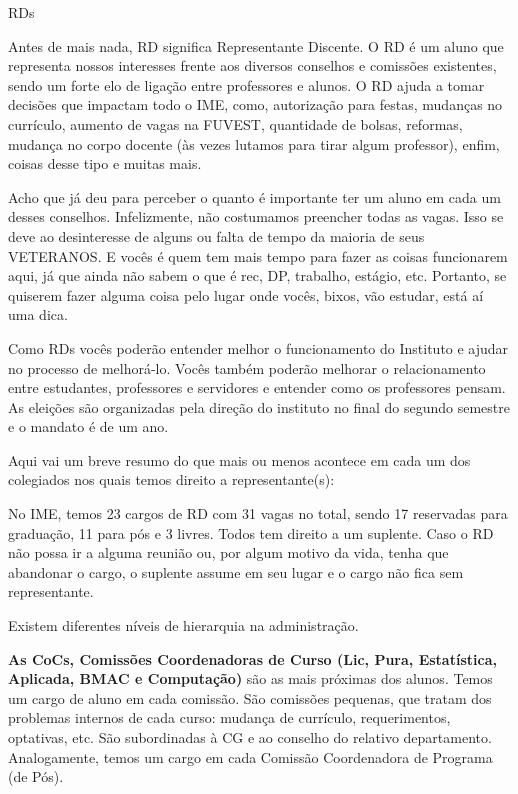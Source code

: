 \begin{subsecao}{RDs}

Antes de mais nada, RD significa Representante Discente. O RD é um aluno que
representa nossos interesses frente aos diversos conselhos e comissões
existentes, sendo um forte elo de ligação entre professores e alunos. O RD
ajuda a tomar decisões que impactam todo o IME, como, autorização para festas,
mudanças no currículo, aumento de vagas na FUVEST, quantidade de bolsas,
reformas, mudança no corpo docente (às vezes lutamos para tirar algum
professor), enfim, coisas desse tipo e muitas mais.

Acho que já deu para perceber o quanto é importante ter um aluno em cada um
desses conselhos. Infelizmente, não costumamos preencher todas as vagas. Isso se
deve ao desinteresse de alguns ou falta de tempo da maioria de seus VETERANOS.
E vocês é quem tem mais tempo para fazer as coisas funcionarem aqui, já que
ainda não sabem o que é rec, DP, trabalho, estágio, etc. Portanto, se quiserem
fazer alguma coisa pelo lugar onde vocês, bixos, vão estudar, está aí
uma dica.

Como RDs vocês poderão entender melhor o funcionamento do Instituto e ajudar no
processo de melhorá-lo. Vocês também poderão melhorar o relacionamento entre
estudantes, professores e servidores e entender como os professores pensam.
As eleições são organizadas pela direção do instituto no final do segundo
semestre e o mandato é de um ano.

Aqui vai um breve resumo do que mais ou menos acontece em cada um dos colegiados
nos quais temos direito a representante(s):

No IME, temos 23 cargos de RD com 31 vagas no total, sendo 17 reservadas
para graduação, 11 para pós e 3 livres. Todos tem direito a um suplente.
Caso o RD não possa ir a alguma reunião ou, por algum motivo da vida, tenha
que abandonar o cargo, o suplente assume em seu lugar e o cargo não fica
sem representante.

Existem diferentes níveis de hierarquia na administração.

{\bf As CoCs,
Comissões Coordenadoras de Curso (Lic, Pura, Estatística, Aplicada, BMAC e
Computação)} são as mais próximas dos alunos. Temos um cargo de aluno em cada
comissão. São comissões pequenas, que tratam dos problemas internos de cada
curso: mudança de currículo, requerimentos, optativas, etc. São subordinadas
à CG e ao conselho do relativo departamento. Analogamente, temos um cargo em cada
Comissão Coordenadora de Programa (de Pós).


\end{subsecao}
